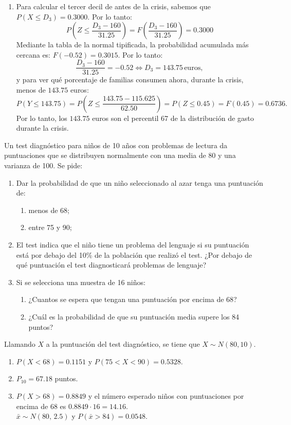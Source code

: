 {\begin{enumerate}
\item Para calcular el tercer decil de antes de la crisis, sabemos que $P(X\leq D_3)=0.3000$. Por lo tanto:
\[
P\left( {Z \le \frac{{D_3  - 160}}{{31.25}}} \right) = F\left( {\frac{{D_3  - 160}}{{31.25}}} \right) = 0.3000
\]
Mediante la tabla de la normal tipificada, la probabilidad acumulada más cercana es: $F(-0.52)=0.3015$. Por lo tanto:
\[
\frac{{D_3  - 160}}{{31.25}} =  - 0.52 \Leftrightarrow D_3  = 143.75\,\mbox{euros},
\]
y para ver qué porcentaje de familias consumen ahora, durante la crisis, menos de $143.75$ euros:
\[
P(Y \le 143.75) = P\left( {Z \le \frac{{143.75 - 115.625}}{{62.50}}} \right) = P(Z \le 0.45) = F(0.45) = 0.6736.
\]
Por lo tanto, los $143.75$ euros son el percentil 67 de la distribución de gasto durante la crisis.
\end{enumerate}
}


{Un test diagnóstico para niños de 10 años con problemas de lectura da puntuaciones que se distribuyen normalmente con
una media de 80 y una varianza de 100.
Se pide:
\begin{enumerate}
\item Dar la probabilidad de que un niño seleccionado al azar tenga una puntuación de:
\begin{enumerate}
\item menos de 68;
\item entre 75 y 90;
\end{enumerate} 
\item El test indica que el niño tiene un problema del lenguaje si su puntuación está por debajo del 10\% de la
población que realizó el test.
¿Por debajo de qué puntuación el test diagnosticará problemas de lenguaje?
\item Si se selecciona una muestra de 16 niños:
\begin{enumerate}
\item ¿Cuantos se espera que tengan una puntuación por encima de 68?
\item ¿Cuál es la probabilidad de que su puntuación media supere los 84 puntos?
\end{enumerate}
\end{enumerate}
}
{Llamando $X$ a la puntuación del test diagnóstico, se tiene que $X\sim N(80,10)$.
\begin{enumerate}
\item $P(X<68)=0.1151$ y $P(75<X<90)=0.5328$.
\item $P_{10}=67.18$ puntos.
\item $P(X>68)=0.8849$ y el número esperado niños con puntuaciones por encima de 68 es \mbox{$0.8849\cdot 16=14.16$}.\\
$\bar x\sim N(80,\,2.5)$ y $P(\bar x>84)=0.0548$.
\end{enumerate}
}
{}


